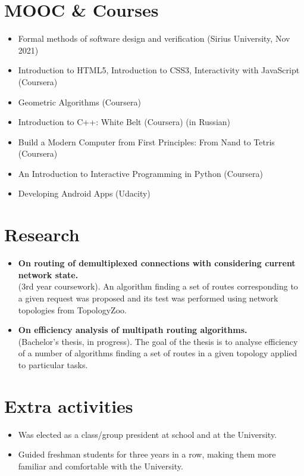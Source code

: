 \documentclass[11pt,a4paper,roman]{moderncv}
\begin{document}
\section{MOOC \& Courses}
\begin{itemize}
    \item Formal methods of software design and verification (Sirius University, Nov 2021)
    \item Introduction to HTML5, Introduction to CSS3, Interactivity with JavaScript (Coursera)
    \item Geometric Algorithms (Coursera)
    \item Introduction to C++: White Belt (Coursera) (in Russian)
    \item Build a Modern Computer from First Principles: From Nand to Tetris (Coursera)
    \item An Introduction to Interactive Programming in Python (Coursera)
    \item Developing Android Apps (Udacity)
\end{itemize}


\section{Research}
  {\begin{itemize}
   \item \textbf{On routing of demultiplexed connections with considering current network state.}\\
   (3rd year coursework). An algorithm finding a set of routes corresponding to a given request was proposed and its test was performed using network topologies from TopologyZoo.

   \item \textbf{On efficiency analysis of multipath routing algorithms.}\\
   (Bachelor's thesis, in progress). The goal of the thesis is to analyse efficiency of a number of algorithms finding a set of routes in a given topology applied to particular tasks.
 \end{itemize}
}


\section{Extra activities}
   	\begin{itemize}
         \item Was elected as a class/group president at school and at the University.
         \item Guided freshman students for three years in a row, making them more familiar and comfortable with the University.
	\end{itemize}
\end{document}
